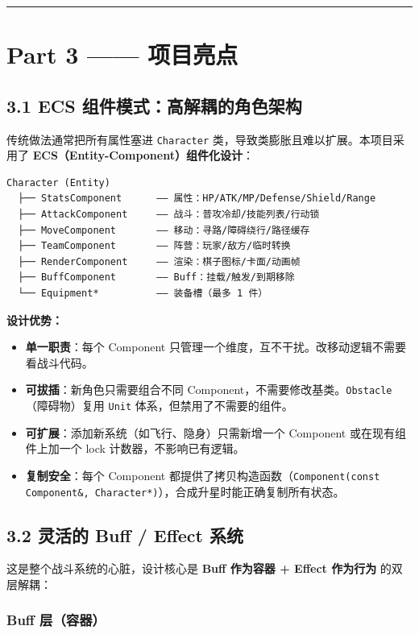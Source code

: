 \documentclass[UTF8,10pt]{ctexart}
\begin{document}
\par\medskip\hrule\medskip

\section*{Part 3 —— 项目亮点}

\subsection*{3.1 ECS 组件模式：高解耦的角色架构}

传统做法通常把所有属性塞进 \texttt{Character} 类，导致类膨胀且难以扩展。本项目采用了 \textbf{ECS（Entity-Component）组件化设计}：

\begin{lstlisting}
Character (Entity)
  ├── StatsComponent      —— 属性：HP/ATK/MP/Defense/Shield/Range
  ├── AttackComponent     —— 战斗：普攻冷却/技能列表/行动锁
  ├── MoveComponent       —— 移动：寻路/障碍绕行/路径缓存
  ├── TeamComponent       —— 阵营：玩家/敌方/临时转换
  ├── RenderComponent     —— 渲染：棋子图标/卡面/动画帧
  ├── BuffComponent       —— Buff：挂载/触发/到期移除
  └── Equipment*          —— 装备槽（最多 1 件）
\end{lstlisting}

\textbf{设计优势：}

\begin{itemize}
\item \textbf{单一职责}：每个 Component 只管理一个维度，互不干扰。改移动逻辑不需要看战斗代码。
\item \textbf{可拔插}：新角色只需要组合不同 Component，不需要修改基类。\texttt{Obstacle}（障碍物）复用 \texttt{Unit} 体系，但禁用了不需要的组件。
\item \textbf{可扩展}：添加新系统（如飞行、隐身）只需新增一个 Component 或在现有组件上加一个 lock 计数器，不影响已有逻辑。
\item \textbf{复制安全}：每个 Component 都提供了拷贝构造函数（\texttt{Component(const Component\&, Character*)}），合成升星时能正确复制所有状态。
\end{itemize}

\subsection*{3.2 灵活的 Buff / Effect 系统}

这是整个战斗系统的心脏，设计核心是 \textbf{Buff 作为容器 + Effect 作为行为} 的双层解耦：

\subsubsection*{Buff 层（容器）}
\end{document}
